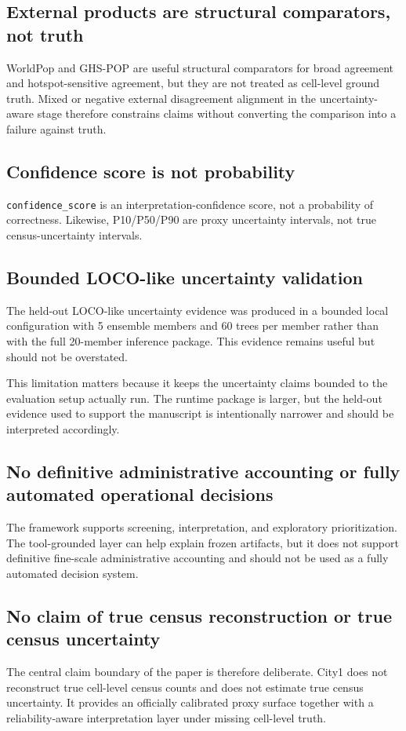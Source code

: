 \subsection{External products are structural comparators, not truth}

WorldPop and GHS-POP are useful structural comparators for broad agreement and hotspot-sensitive agreement, but they are not treated as cell-level ground truth. Mixed or negative external disagreement alignment in the uncertainty-aware stage therefore constrains claims without converting the comparison into a failure against truth.

\subsection{Confidence score is not probability}

\texttt{confidence\_score} is an interpretation-confidence score, not a probability of correctness. Likewise, P10/P50/P90 are proxy uncertainty intervals, not true census-uncertainty intervals.

\subsection{Bounded LOCO-like uncertainty validation}

The held-out LOCO-like uncertainty evidence was produced in a bounded local configuration with 5 ensemble members and 60 trees per member rather than with the full 20-member inference package. This evidence remains useful but should not be overstated.

This limitation matters because it keeps the uncertainty claims bounded to the evaluation setup actually run. The runtime package is larger, but the held-out evidence used to support the manuscript is intentionally narrower and should be interpreted accordingly.

\subsection{No definitive administrative accounting or fully automated operational decisions}

The framework supports screening, interpretation, and exploratory prioritization. The tool-grounded layer can help explain frozen artifacts, but it does not support definitive fine-scale administrative accounting and should not be used as a fully automated decision system.

\subsection{No claim of true census reconstruction or true census uncertainty}

The central claim boundary of the paper is therefore deliberate. City1 does not reconstruct true cell-level census counts and does not estimate true census uncertainty. It provides an officially calibrated proxy surface together with a reliability-aware interpretation layer under missing cell-level truth.
